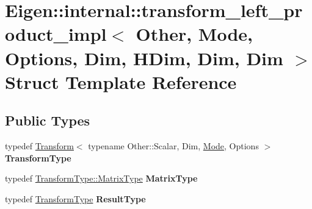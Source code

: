 \hypertarget{struct_eigen_1_1internal_1_1transform__left__product__impl_3_01_other_00_01_mode_00_01_options_0b0d1bc6bb0265d07cac191ec3dc368a3}{}\section{Eigen\+::internal\+::transform\+\_\+left\+\_\+product\+\_\+impl$<$ Other, Mode, Options, Dim, H\+Dim, Dim, Dim $>$ Struct Template Reference}
\label{struct_eigen_1_1internal_1_1transform__left__product__impl_3_01_other_00_01_mode_00_01_options_0b0d1bc6bb0265d07cac191ec3dc368a3}
\subsection*{Public Types}
\begin{DoxyCompactItemize}
\item 
\mbox{\label{struct_eigen_1_1internal_1_1transform__left__product__impl_3_01_other_00_01_mode_00_01_options_0b0d1bc6bb0265d07cac191ec3dc368a3_a5c06b4d68565a7cd9ff4650ffb188bbe}} 
typedef \mbox{\hyperlink{class_eigen_1_1_transform}{Transform}}$<$ typename Other\+::\+Scalar, Dim, \mbox{\hyperlink{struct_mode}{Mode}}, Options $>$ {\bfseries Transform\+Type}
\item 
\mbox{\label{struct_eigen_1_1internal_1_1transform__left__product__impl_3_01_other_00_01_mode_00_01_options_0b0d1bc6bb0265d07cac191ec3dc368a3_a6dd1ac5580bb29ee83d69fa2b9a6fcf5}} 
typedef \mbox{\hyperlink{class_eigen_1_1_transform_a30f72ba46abc2bb3c7fa919c1078fc9c}{Transform\+Type\+::\+Matrix\+Type}} {\bfseries Matrix\+Type}
\item 
\mbox{\label{struct_eigen_1_1internal_1_1transform__left__product__impl_3_01_other_00_01_mode_00_01_options_0b0d1bc6bb0265d07cac191ec3dc368a3_ac5f81a73666a635b08b5f9bef98b4132}} 
typedef \mbox{\hyperlink{class_eigen_1_1_transform}{Transform\+Type}} {\bfseries Result\+Type}
\end{DoxyCompactItemize}
